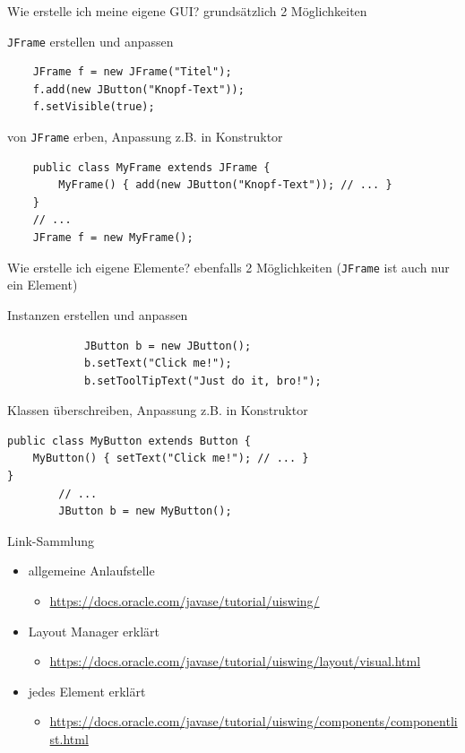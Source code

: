\documentclass[18pt]{beamer}
\begin{document}
\begin{frame}[fragile]{Wie erstelle ich meine eigene GUI?}
grundsätzlich 2 Möglichkeiten
\begin{block}{\texttt{JFrame} erstellen und anpassen}
	\begin{verbatim}
	JFrame f = new JFrame("Titel");
	f.add(new JButton("Knopf-Text"));
	f.setVisible(true);
	\end{verbatim}
\end{block}
\pause
\begin{block}{von \texttt{JFrame} erben, Anpassung z.B. in Konstruktor}
	\begin{verbatim}
	public class MyFrame extends JFrame { 
	    MyFrame() { add(new JButton("Knopf-Text")); // ... } 
	}
	// ...
	JFrame f = new MyFrame();
	\end{verbatim}
\end{block}
\end{frame}

\begin{frame}[fragile]{Wie erstelle ich eigene Elemente?}
	ebenfalls 2 Möglichkeiten (\texttt{JFrame} ist auch nur ein Element)
	\begin{block}{Instanzen erstellen und anpassen}
		\begin{verbatim}
			JButton b = new JButton();
			b.setText("Click me!");
			b.setToolTipText("Just do it, bro!");
		\end{verbatim}
	\end{block}
	\pause
		\begin{block}{Klassen überschreiben, Anpassung z.B. in Konstruktor}
		\begin{verbatim}
public class MyButton extends Button { 
    MyButton() { setText("Click me!"); // ... } 
}
		// ...
		JButton b = new MyButton();
		\end{verbatim}
	\end{block}
\end{frame}


\begin{frame}{Link-Sammlung}
	\begin{itemize}
		\item allgemeine Anlaufstelle
		\begin{itemize}
			\item \url{https://docs.oracle.com/javase/tutorial/uiswing/}
		\end{itemize}
		\item Layout Manager erklärt
		\begin{itemize}
			\item \url{https://docs.oracle.com/javase/tutorial/uiswing/layout/visual.html}
		\end{itemize}
		\item jedes Element erklärt
		\begin{itemize}
			\item \url{https://docs.oracle.com/javase/tutorial/uiswing/components/componentlist.html}
		\end{itemize}
	\end{itemize}	
\end{frame}
\end{document}

